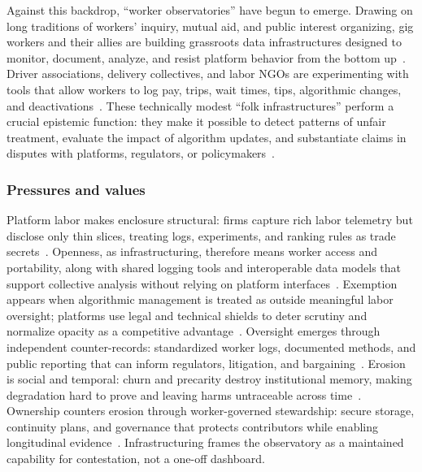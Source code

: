 \documentclass[acmsmall,screen]{acmart}
\begin{document}
Against this backdrop, ``worker observatories'' have begun to emerge. Drawing on long traditions of workers' inquiry, mutual aid, and public interest organizing, gig workers and their allies are building grassroots data infrastructures designed to monitor, document, analyze, and resist platform behavior from the bottom up~\cite{calacciOrganizingEndEmployment2022,calacciBargainingBlackBoxDesigning2022,vincentDataStrikesEvaluating2019}. Driver associations, delivery collectives, and labor NGOs are experimenting with tools that allow workers to log pay, trips, wait times, tips, algorithmic changes, and deactivations~\cite{hernandezEndDayAm2024,doDesigningGigWorker2024,hsiehGig2GetherDatasharingEmpower2025}. These technically modest ``folk infrastructures'' perform a crucial epistemic function: they make it possible to detect patterns of unfair treatment, evaluate the impact of algorithm updates, and substantiate claims in disputes with platforms, regulators, or policymakers~\cite{dalalLessonsWorkersInquiry2024,nagarajraoRideshareTransparencyTranslating2025,calacciAccessUnderstandingCollective2023}.

\subsubsection*{Pressures and values}
Platform labor makes enclosure structural: firms capture rich labor telemetry but disclose only thin slices, treating logs, experiments, and ranking rules as trade secrets~\cite{jarrahiAlgorithmicManagementWork2021,steinYouAreYou2023}. Openness, as infrastructuring, therefore means worker access and portability, along with shared logging tools and interoperable data models that support collective analysis without relying on platform interfaces~\cite{calacciAccessUnderstandingCollective2023,hsiehGig2GetherDatasharingEmpower2025}. Exemption appears when algorithmic management is treated as outside meaningful labor oversight; platforms use legal and technical shields to deter scrutiny and normalize opacity as a competitive advantage~\cite{calacciBargainingBlackBoxDesigning2022,vincentDataLeverageFramework2021a}. Oversight emerges through independent counter-records: standardized worker logs, documented methods, and public reporting that can inform regulators, litigation, and bargaining~\cite{nagarajraoRideshareTransparencyTranslating2025,dalalLessonsWorkersInquiry2024}. Erosion is social and temporal: churn and precarity destroy institutional memory, making degradation hard to prove and leaving harms untraceable across time~\cite{hernandezEndDayAm2024,binnsNotEvenNice2025}. Ownership counters erosion through worker-governed stewardship: secure storage, continuity plans, and governance that protects contributors while enabling longitudinal evidence~\cite{calacciAccessUnderstandingCollective2023,steinYouAreYou2023}. Infrastructuring frames the observatory as a maintained capability for contestation, not a one-off dashboard.
\end{document}
